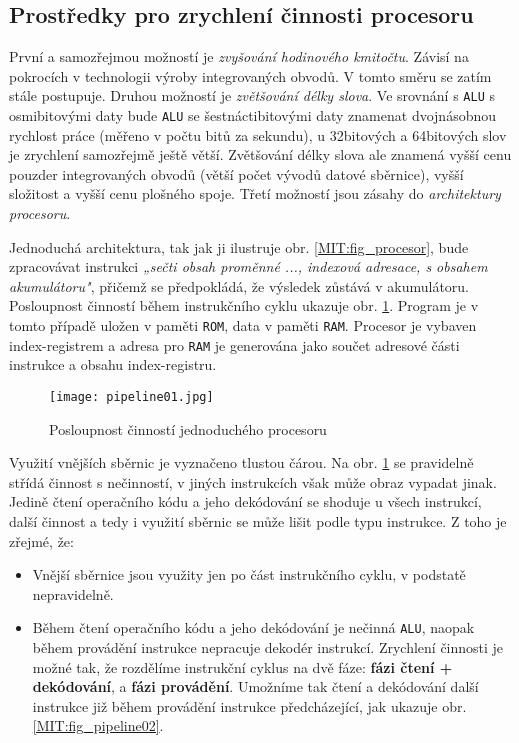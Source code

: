     \subsection{Prostředky pro zrychlení činnosti procesoru}\label{ces:IchapIVsecIIssecIII}
      První a samozřejmou možností je \emph{zvyšování hodinového kmitočtu}. Závisí na pokrocích v 
      technologii výroby integrovaných obvodů. V tomto směru se zatím stále postupuje. Druhou 
      možností je \emph{zvětšování délky slova}. Ve srovnání s \texttt{ALU} s osmibitovými daty 
      bude \texttt{ALU} se šestnáctibitovými daty znamenat dvojnásobnou rychlost práce (měřeno v 
      počtu bitů za sekundu), u 32bitových a 64bitových slov je zrychlení samozřejmě ještě větší. 
      Zvětšování délky slova ale znamená vyšší cenu pouzder integrovaných obvodů (větší počet 
      vývodů datové sběrnice), vyšší složitost a vyšší cenu plošného spoje. Třetí možností jsou 
      zásahy do \emph{architektury procesoru}.
      
      Jednoduchá architektura, tak jak ji ilustruje obr. \ref{MIT:fig_procesor}, bude zpracovávat 
      instrukci \emph{„sečti obsah proměnné ..., indexová adresace, s obsahem akumulátoru"}, 
      přičemž se předpokládá, že výsledek zůstává v akumulátoru. Posloupnost činností během 
      instrukčního cyklu ukazuje obr. \ref{MIT:fig_pipeline01}. Program je v tomto případě uložen v 
      paměti \texttt{ROM}, data v paměti \texttt{RAM}. Procesor je vybaven index-registrem a adresa 
      pro \texttt{RAM} je generována jako součet adresové části instrukce a obsahu index-registru.
      
      \begin{figure}[ht!] %
        \centering
        \texttt{[image: pipeline01.jpg]}
        \caption{Posloupnost činností jednoduchého procesoru}
        \label{MIT:fig_pipeline01}
      \end{figure}     
      
      Využití vnějších sběrnic je vyznačeno tlustou čárou. Na obr. \ref{MIT:fig_pipeline01} se 
      pravidelně střídá činnost s nečinností, v jiných instrukcích však může obraz vypadat jinak. 
      Jedině čtení operačního kódu a jeho dekódování se shoduje u všech instrukcí, další činnost a 
      tedy i využití sběrnic se může lišit podle typu instrukce. Z toho je zřejmé, že:
      \begin{itemize}\addtolength{\itemsep}{-0.5\baselineskip}
        \item Vnější sběrnice jsou využity jen po část instrukčního cyklu, v podstatě nepravidelně.
        \item Během čtení operačního kódu a jeho dekódování je nečinná \texttt{ALU}, naopak během  
              provádění  instrukce nepracuje dekodér instrukcí. Zrychlení činnosti je možné tak, že 
              rozdělíme instrukční cyklus na dvě fáze: \textbf{fázi čtení + dekódování}, a 
              \textbf{fázi provádění}. Umožníme tak čtení a dekódování další instrukce již během 
              provádění instrukce předcházející, jak ukazuje obr. \ref{MIT:fig_pipeline02}.
      \end{itemize}        
      
